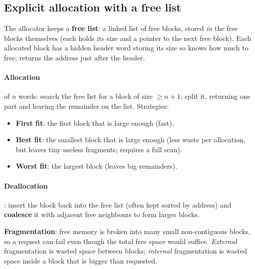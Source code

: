 \begin{center}
\end{center}

\subsection{Explicit allocation with a free list}
The allocator keeps a \textbf{free list}: a linked list of free blocks, stored \emph{in} the
free blocks themselves (each holds its size and a pointer to the next free block). Each
allocated block has a hidden header word storing its size so  knows how much to
free;  returns the address just after the header.

\paragraph{Allocation} of $n$ words: search the free list for a block of size $\ge n+1$; split
it, returning one part and leaving the remainder on the list. Strategies:
\begin{itemize}
  \item \textbf{First fit}: the first block that is large enough (fast).
  \item \textbf{Best fit}: the smallest block that is large enough (less waste per allocation,
        but leaves tiny useless fragments; requires a full scan).
  \item \textbf{Worst fit}: the largest block (leaves big remainders).
\end{itemize}
\paragraph{Deallocation}: insert the block back into the free list (often kept sorted by
address) and \textbf{coalesce} it with adjacent free neighbours to form larger blocks.

\begin{definition}
\textbf{Fragmentation}: free memory is broken into many small non-contiguous blocks, so a
request can fail even though the total free space would suffice. \emph{External}
fragmentation is wasted space between blocks; \emph{internal} fragmentation is wasted space
inside a block that is bigger than requested.
\end{definition}

